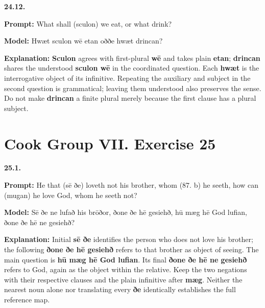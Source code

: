 \par\begin{minipage}{\linewidth}\raggedright
\textbf{24.12.}

\textbf{Prompt:} What shall (sculon) we eat, or what drink?

\textbf{Model:} Hwæt sculon wē etan oððe hwæt drincan?

\textbf{Explanation:} \textbf{Sculon} agrees with first-plural \textbf{wē} and takes plain \textbf{etan}; \textbf{drincan} shares the understood \textbf{sculon wē} in the coordinated question. Each \textbf{hwæt} is the interrogative object of its infinitive. Repeating the auxiliary and subject in the second question is grammatical; leaving them understood also preserves the sense. Do not make \textbf{drincan} a finite plural merely because the first clause has a plural subject.

\end{minipage}\par\addvspace{4pt}

\section*{Cook Group VII. Exercise 25}

\par\begin{minipage}{\linewidth}\raggedright
\textbf{25.1.}

\textbf{Prompt:} He that (sē ðe) loveth not his brother, whom (87. b) he seeth, how can (mugan) he love God, whom he seeth not?

\textbf{Model:} Sē ðe ne lufað his brōðor, ðone ðe hē gesiehð, hū mæg hē God lufian, ðone ðe hē ne gesiehð?

\textbf{Explanation:} Initial \textbf{sē ðe} identifies the person who does not love his brother; the following \textbf{ðone ðe hē gesiehð} refers to that brother as object of seeing. The main question is \textbf{hū mæg hē God lufian}. Its final \textbf{ðone ðe hē ne gesiehð} refers to God, again as the object within the relative. Keep the two negations with their respective clauses and the plain infinitive after \textbf{mæg}. Neither the nearest noun alone nor translating every \textbf{ðe} identically establishes the full reference map.

\end{minipage}\par\addvspace{4pt}


